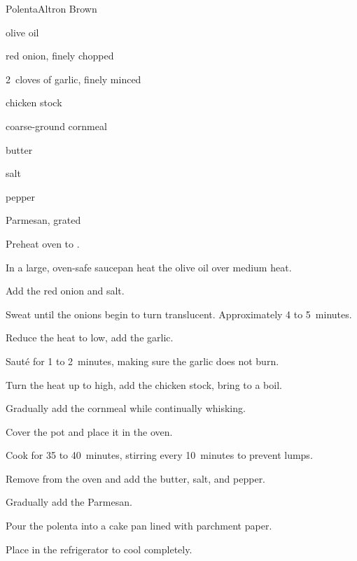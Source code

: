 \begin{recipe}{Polenta}{Altron Brown}{}

\begin{ingredients}
\item {} olive oil
\item \C{\threequarter} red onion, finely chopped
\item 2~cloves of garlic, finely minced 
\item {} chicken stock
\item {} coarse-ground cornmeal 
\item {} butter 
\item \tp{1\half} salt 
\item \tp{\quarter} pepper 
\item \C{\third} Parmesan, grated
\end{ingredients}

\begin{directions}
\item Preheat oven to . 
\item In a large, oven-safe saucepan heat the olive oil over medium heat.
\item Add the red onion and salt.
\item Sweat until the onions begin to turn translucent. Approximately 4 to 5~minutes.
\item Reduce the heat to low, add the garlic.
\item Saut\'e for 1 to 2~minutes, making sure the garlic does not burn.
\item Turn the heat up to high, add the chicken stock, bring to a boil.
\item Gradually add the cornmeal while continually whisking.
\item Cover the pot and place it in the oven.
\item Cook for 35 to 40~minutes, stirring every 10~minutes to prevent lumps.
\item Remove from the oven and add the butter, salt, and pepper.
\item Gradually add the Parmesan. 
\item Pour the polenta into a cake pan lined with parchment paper.
\item Place in the refrigerator to cool completely. 
\end{directions}
\end{recipe}

